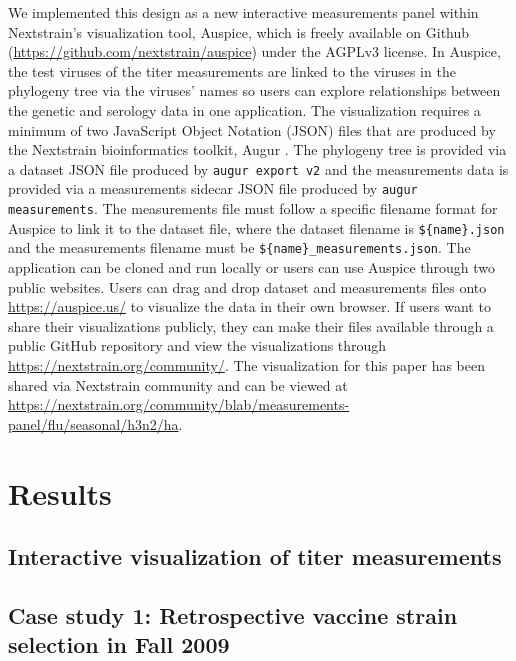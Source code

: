 \documentclass[utf8]{FrontiersinHarvard} %
\begin{document}
We implemented this design as a new interactive measurements panel within Nextstrain's visualization tool, Auspice, which is freely available on Github (\url{https://github.com/nextstrain/auspice}) under the AGPLv3 license.
In Auspice, the test viruses of the titer measurements are linked to the viruses in the phylogeny tree via the viruses' names so users can explore relationships between the genetic and serology data in one application.
The visualization requires a minimum of two JavaScript Object Notation (JSON) files that are produced by the Nextstrain bioinformatics toolkit, Augur \citep{Huddleston2021}.
The phylogeny tree is provided via a dataset JSON file produced by \texttt{augur export v2} and the measurements data is provided via a measurements sidecar JSON file produced by \texttt{augur measurements}.
The measurements file must follow a specific filename format for Auspice to link it to the dataset file, where the dataset filename is \texttt{\$\{name\}.json} and the measurements filename must be \texttt{\$\{name\}\_measurements.json}.
The application can be cloned and run locally or users can use Auspice through two public websites.
Users can drag and drop dataset and measurements files onto \url{https://auspice.us/} to visualize the data in their own browser.
If users want to share their visualizations publicly, they can make their files available through a public GitHub repository and view the visualizations through \url{https://nextstrain.org/community/}.
The visualization for this paper has been shared via Nextstrain community and can be viewed at \url{https://nextstrain.org/community/blab/measurements-panel/flu/seasonal/h3n2/ha}.

\section{Results}

\subsection{Interactive visualization of titer measurements}

\subsection{Case study 1: Retrospective vaccine strain selection in Fall 2009}
\end{document}

